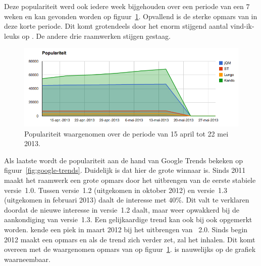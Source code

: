 Deze populariteit werd ook iedere week bijgehouden over een periode van een $7$ weken en kan gevonden worden op figuur~\ref{fig:populariteit-evolutie}.
Opvallend is de sterke opmars van \kendo{} in deze korte periode.
Dit komt grotendeels door het enorm stijgend aantal vind-ik-leuks op \fb{}.
De andere drie raamwerken stijgen gestaag.

\begin{figure}
  \centering
  \includegraphics[width=\textwidth]{figuren/populariteit.png}
  \caption{Populariteit waargenomen over de periode van 15 april tot 22 mei 2013.}
  \label{fig:populariteit-evolutie}
\end{figure}

Als laatste wordt de populariteit aan de hand van Google Trends bekeken op figuur~\ref{fig:google-trends}.
Duidelijk is dat hier \jqm{} de grote winnaar is.
Sinds 2011 maakt het raamwerk een grote opmars door het uitbrengen van de eerste stabiele versie~1.0.
Tussen versie~1.2 (uitgekomen in oktober 2012) en versie~1.3 (uitgekomen in februari 2013) daalt de interesse met $40\%$.
Dit valt te verklaren doordat de nieuwe interesse in versie~1.2 daalt, maar weer opwakkerd bij de aankondiging van versie~1.3. 
Een gelijkaardige trend kan ook bij \st{} ook opgemerkt worden.
\st{} kende een piek in maart 2012 bij het uitbrengen van \st{}~2.0.
Sinds begin 2012 maakt \kendo{} een opmars en als de trend zich verder zet, zal het \st{} inhalen.
Dit komt overeen met de waargenomen opmars van \kendo{} op figuur~\ref{fig:populariteit-evolutie}.
\lungo{} is nauwelijks op de grafiek waarneembaar.

